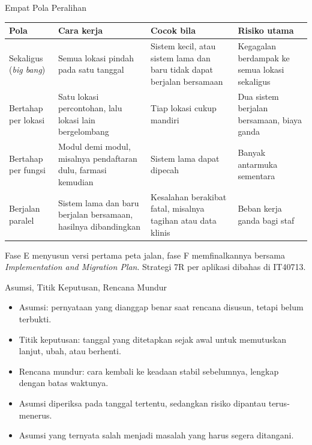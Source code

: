 \documentclass[aspectratio=169, table, 12pt]{beamer}
\begin{document}
\begin{frame}{{\Large Empat Pola Peralihan}}
  \scriptsize
  \begin{tabularx}{\textwidth}{L{2.1cm}YYY}
    \hline
    \textbf{Pola} & \textbf{Cara kerja} & \textbf{Cocok bila} & \textbf{Risiko utama} \\
    \hline
    Sekaligus (\textit{big bang}) & Semua lokasi pindah pada satu tanggal &
      Sistem kecil, atau sistem lama dan baru tidak dapat berjalan bersamaan &
      Kegagalan berdampak ke semua lokasi sekaligus \\
    \hline
    Bertahap per lokasi & Satu lokasi percontohan, lalu lokasi lain bergelombang &
      Tiap lokasi cukup mandiri & Dua sistem berjalan bersamaan, biaya ganda \\
    \hline
    Bertahap per fungsi & Modul demi modul, misalnya pendaftaran dulu, farmasi
      kemudian & Sistem lama dapat dipecah & Banyak antarmuka sementara \\
    \hline
    Berjalan paralel & Sistem lama dan baru berjalan bersamaan, hasilnya
      dibandingkan & Kesalahan berakibat fatal, misalnya tagihan atau data
      klinis & Beban kerja ganda bagi staf \\
    \hline
  \end{tabularx}

  \vspace{6pt}
  \small Fase E menyusun versi pertama peta jalan, fase F memfinalkannya bersama
  \textit{Implementation and Migration Plan}. Strategi 7R per aplikasi dibahas di IT40713.
\end{frame}

\begin{frame}{{\Large Asumsi, Titik Keputusan, Rencana Mundur}}
  \small
  \vspace{4pt}
  \begin{itemize}
    \item Asumsi: pernyataan yang dianggap benar saat rencana disusun, tetapi belum terbukti.
    \item Titik keputusan: tanggal yang ditetapkan sejak awal untuk memutuskan lanjut, ubah, atau
          berhenti.
    \item Rencana mundur: cara kembali ke keadaan stabil sebelumnya, lengkap dengan batas waktunya.
    \item Asumsi diperiksa pada tanggal tertentu, sedangkan risiko dipantau terus-menerus.
    \item Asumsi yang ternyata salah menjadi masalah yang harus segera ditangani.
  \end{itemize}
\end{frame}
\end{document}
